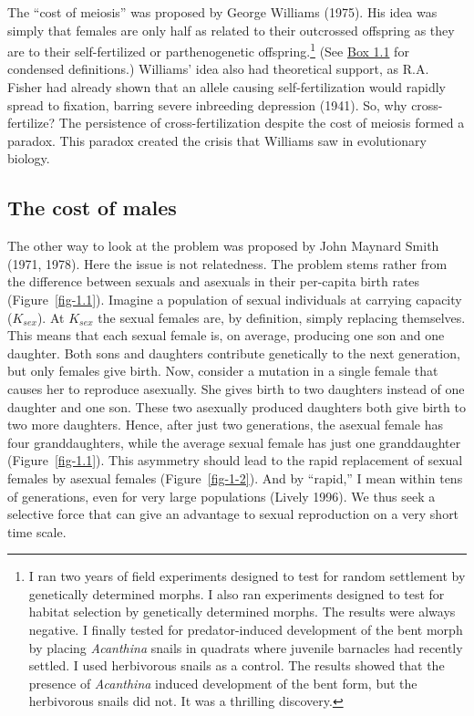 \documentclass[
  letterpaper,
]{book}
\begin{document}
The ``cost of meiosis'' was proposed by George Williams (1975). His idea
was simply that females are only half as related to their outcrossed
offspring as they are to their self-fertilized or parthenogenetic
offspring.\footnote{I ran two years of field experiments designed to
  test for random settlement by genetically determined morphs. I also
  ran experiments designed to test for habitat selection by genetically
  determined morphs. The results were always negative. I finally tested
  for predator-induced development of the bent morph by placing
  \emph{Acanthina} snails in quadrats where juvenile barnacles had
  recently settled. I used herbivorous snails as a control. The results
  showed that the presence of \emph{Acanthina} induced development of
  the bent form, but the herbivorous snails did not. It was a thrilling
  discovery.} (See \protect\hyperlink{callout-1}{Box 1.1} for condensed
definitions.) Williams' idea also had theoretical support, as R.A.
Fisher had already shown that an allele causing self-fertilization would
rapidly spread to fixation, barring severe inbreeding depression (1941).
So, why cross-fertilize? The persistence of cross-fertilization despite
the cost of meiosis formed a paradox. This paradox created the crisis
that Williams saw in evolutionary biology.

\hypertarget{the-cost-of-males}{%
\subsection{The cost of males}\label{the-cost-of-males}}

The other way to look at the problem was proposed by John Maynard Smith
(1971, 1978). Here the issue is not relatedness. The problem stems
rather from the difference between sexuals and asexuals in their
per-capita birth rates (Figure~\ref{fig-1.1}). Imagine a population of
sexual individuals at carrying capacity (\(K_{sex}\)). At \(K_{sex}\)
the sexual females are, by definition, simply replacing themselves. This
means that each sexual female is, on average, producing one son and one
daughter. Both sons and daughters contribute genetically to the next
generation, but only females give birth. Now, consider a mutation in a
single female that causes her to reproduce asexually. She gives birth to
two daughters instead of one daughter and one son. These two asexually
produced daughters both give birth to two more daughters. Hence, after
just two generations, the asexual female has four granddaughters, while
the average sexual female has just one granddaughter
(Figure~\ref{fig-1.1}). This asymmetry should lead to the rapid
replacement of sexual females by asexual females (Figure~\ref{fig-1-2}).
And by ``rapid,'' I mean within tens of generations, even for very large
populations (Lively 1996). We thus seek a selective force that can give
an advantage to sexual reproduction on a very short time scale.
\end{document}
